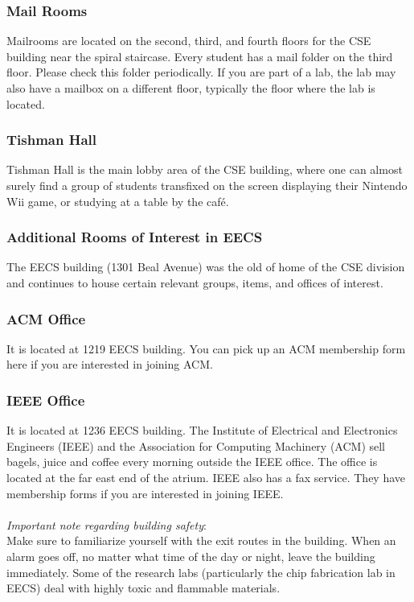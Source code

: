 \documentclass[11pt]{article}
\begin{document}
\subsubsection{Mail Rooms}
\label{sec-3_1_4}

Mailrooms are located on the second, third, and fourth floors for the CSE building near the spiral staircase.  Every student has a mail folder on the third floor.  Please check this folder periodically.  If you are part of a lab, the lab may also have a mailbox on a different floor, typically the floor where the lab is located.
\subsubsection{Tishman Hall}
\label{sec-3_1_5}

Tishman Hall is the main lobby area of the CSE building, where one can almost surely find a group of students transfixed on the screen displaying their Nintendo Wii game, or studying at a table by the café.
\subsubsection{Additional Rooms of Interest in EECS}
\label{sec-3_1_6}

The EECS building (1301 Beal Avenue) was the old of home of the CSE division and continues to house certain relevant groups, items, and offices of interest.
\subsubsection{ACM Office}
\label{sec-3_1_7}

It is located at 1219 EECS building. You can pick up an ACM membership form here if you are interested in joining ACM.
\subsubsection{IEEE Office}
\label{sec-3_1_8}

It is located at 1236 EECS building. The Institute of Electrical and
Electronics Engineers (IEEE) and the Association for Computing
Machinery (ACM) sell bagels, juice and coffee every morning outside
the IEEE office.  The office is located at the far east end of the
atrium.  IEEE also has a fax service.  They have membership forms if
you are interested in joining IEEE.
\\
\\
\emph{Important note regarding building safety}:\\
Make sure to familiarize yourself with the exit routes in the building.  When an alarm goes off, no matter what time of the day or night, leave the building immediately.  Some of the research labs (particularly the chip fabrication lab in EECS) deal with highly toxic and flammable materials.
\end{document}
